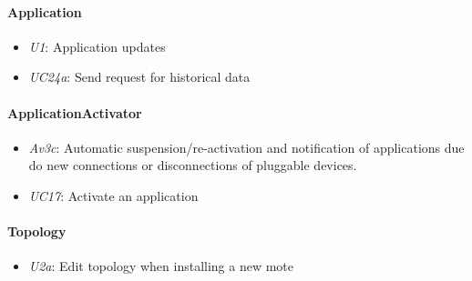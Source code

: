 \documentclass[english]{sareport}
\begin{document}
\paragraph{Application}
\begin{itemize}
	\item \emph{U1}: Application updates
	\item \emph{UC24a}: Send request for historical data
\end{itemize}

\paragraph{ApplicationActivator}
\begin{itemize}
	\item \emph{Av3c}: Automatic suspension/re-activation and notification of applications due do new connections or disconnections of pluggable devices.
	\item \emph{UC17}: Activate an application
\end{itemize}

\paragraph{Topology}
\begin{itemize}
	\item \emph{U2a}: Edit topology when installing a new mote
\end{itemize}
\end{document}
